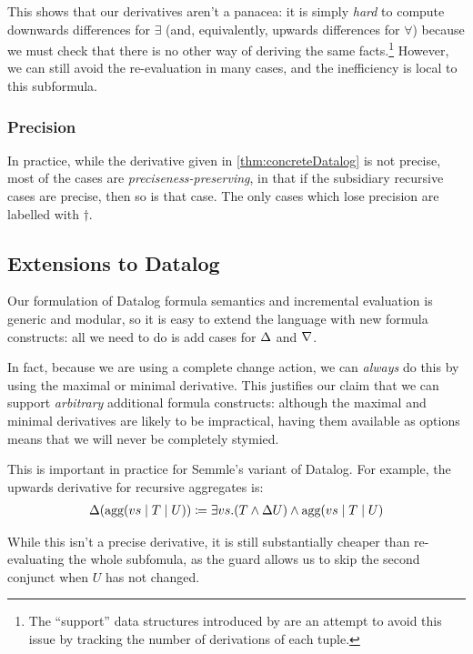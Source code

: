 This shows that our derivatives aren't a panacea: it is simply \emph{hard} to compute
downwards differences for $\exists$ (and, equivalently, upwards differences for
$\forall$) because we must check that there is no other way of deriving the same
facts.\footnote{The ``support'' data structures introduced by
  \autocite{gupta1993maintaining} are an attempt to avoid this issue by
  tracking the number of derivations of each tuple.} However, we can still avoid
the re-evaluation in many cases, and the inefficiency is local to this subformula.

\subsubsection{Precision}

In practice, while the derivative given in \cref{thm:concreteDatalog} is not
precise, most of the cases are \emph{preciseness-preserving}, in that if the
subsidiary recursive cases are precise, then so is that case. The only cases
which lose precision are labelled with $\dagger$.

\subsection{Extensions to Datalog}
\label{sec:extensions}

Our formulation of Datalog formula semantics and incremental evaluation is 
generic and modular, so it is easy to extend the language with new
formula constructs: all we need to do is add cases for $\Delta$ and $\nabla$.

In fact, because we are using a complete change action, we can \emph{always} do this by using the maximal or
minimal derivative. This justifies our claim that we can support
\emph{arbitrary} additional formula constructs: although the maximal and minimal
derivatives are likely to be impractical, having them
available as options means that we will never be completely stymied.

This is important in practice for Semmle's variant of Datalog. For example, the
upwards derivative for recursive aggregates \autocite{demoor2013aggregates} is:
\begin{align*}
  \Delta(\textrm{agg}(vs \mid T \mid U)) \coloneqq \exists vs. (T \wedge \Delta{U}) \wedge \textrm{agg}(vs \mid T \mid U)
\end{align*}

While this isn't a precise derivative, it is still substantially cheaper than
re-evaluating the whole subfomula, as the guard allows us to skip the second conjunct when $U$
has not changed.

